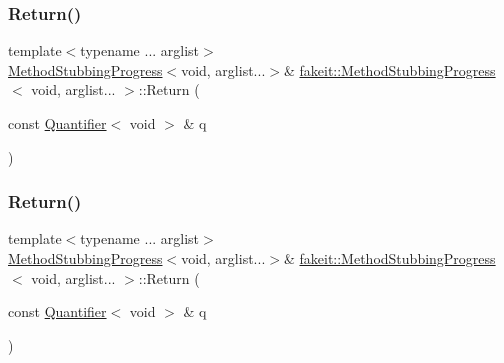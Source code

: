 \mbox{\label{structfakeit_1_1MethodStubbingProgress_3_01void_00_01arglist_8_8_8_01_4_afbc0d4429dddcbab63de1c88176ea0f1}} 
\subsubsection{\texorpdfstring{Return()}{Return()}\hspace{0.1cm}{\footnotesize\ttfamily [12/18]}}
{\footnotesize\ttfamily template$<$typename ... arglist$>$ \\
\mbox{\hyperlink{structfakeit_1_1MethodStubbingProgress}{Method\+Stubbing\+Progress}}$<$void, arglist...$>$\& \mbox{\hyperlink{structfakeit_1_1MethodStubbingProgress}{fakeit\+::\+Method\+Stubbing\+Progress}}$<$ void, arglist... $>$\+::Return (\begin{DoxyParamCaption}\item[{const \mbox{\hyperlink{structfakeit_1_1Quantifier}{Quantifier}}$<$ void $>$ \&}]{q }\end{DoxyParamCaption})\hspace{0.3cm}{\ttfamily [inline]}}

\mbox{\label{structfakeit_1_1MethodStubbingProgress_3_01void_00_01arglist_8_8_8_01_4_afbc0d4429dddcbab63de1c88176ea0f1}} 
\subsubsection{\texorpdfstring{Return()}{Return()}\hspace{0.1cm}{\footnotesize\ttfamily [13/18]}}
{\footnotesize\ttfamily template$<$typename ... arglist$>$ \\
\mbox{\hyperlink{structfakeit_1_1MethodStubbingProgress}{Method\+Stubbing\+Progress}}$<$void, arglist...$>$\& \mbox{\hyperlink{structfakeit_1_1MethodStubbingProgress}{fakeit\+::\+Method\+Stubbing\+Progress}}$<$ void, arglist... $>$\+::Return (\begin{DoxyParamCaption}\item[{const \mbox{\hyperlink{structfakeit_1_1Quantifier}{Quantifier}}$<$ void $>$ \&}]{q }\end{DoxyParamCaption})\hspace{0.3cm}{\ttfamily [inline]}}

